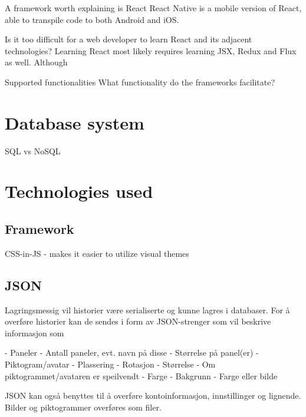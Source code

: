 A framework worth explaining is React
React Native is a mobile version of React, able to transpile code to both Android and iOS.

Is it too difficult for a web developer to learn React and its adjacent technologies? Learning React most likely requires learning JSX, Redux and Flux as well. Although 

Supported functionalities
What functionality do the frameworks facilitate?

\section{Database system}

SQL vs NoSQL

\section{Technologies used}

\subsection{Framework}


CSS-in-JS - makes it easier to utilize visual themes

\subsection{JSON}

Lagringsmessig vil historier være serialiserte og kunne lagres i databaser. For å overføre historier kan de sendes i form av JSON-strenger som vil beskrive informasjon som

- Paneler
	- Antall paneler, evt. navn på disse
	- Størrelse på panel(er)
- Piktogram/avatar
    - Plassering
	- Rotasjon
	- Størrelse
	- Om piktogrammet/avataren er speilvendt
	- Farge
- Bakgrunn
    - Farge eller bilde

JSON kan også benyttes til å overføre kontoinformasjon, innstillinger og lignende. Bilder og piktogrammer overføres som filer.
